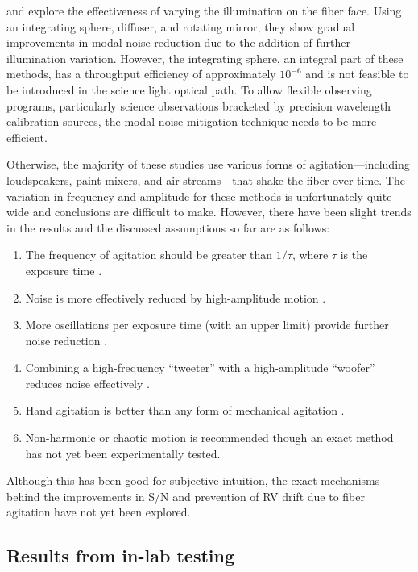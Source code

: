 \documentclass[11pt]{article}
\begin{document}
\citet{Mahadevan2014} and \citet{Halverson2014} explore the effectiveness of varying the illumination on the fiber face. Using an integrating sphere, diffuser, and rotating mirror, they show gradual improvements in modal noise reduction due to the addition of further illumination variation. However, the integrating sphere, an integral part of these methods, has a throughput efficiency of approximately $10^{-6}$ and is not feasible to be introduced in the science light optical path. To allow flexible observing programs, particularly science observations bracketed by precision wavelength calibration sources, the modal noise mitigation technique needs to be more efficient.

Otherwise, the majority of these studies use various forms of agitation---including loudspeakers, paint mixers, and air streams---that shake the fiber over time. The variation in frequency and amplitude for these methods is unfortunately quite wide and conclusions are difficult to make. However, there have been slight trends in the results and the discussed assumptions so far are as follows:
\begin{enumerate}
\item The frequency of agitation should be greater than $1/\tau$, where $\tau$ is the exposure time \citep{Baudrand2001}.
\item Noise is more effectively reduced by high-amplitude motion \citep{Lemke2011, McCoy2012}.
\item More oscillations per exposure time (with an upper limit) provide further noise reduction \citep{Lemke2011}.
\item Combining a high-frequency ``tweeter'' with a high-amplitude ``woofer'' reduces noise effectively \citep{Plavchan2013}.
\item Hand agitation is better than any form of mechanical agitation \citep{Lemke2011, McCoy2012, Mahadevan2014, Roy2014}.
\item Non-harmonic or chaotic motion is recommended \citep{Grupp2003} though an exact method has not yet been experimentally tested.
\end{enumerate}
Although this has been good for subjective intuition, the exact mechanisms behind the improvements in S/N and prevention of RV drift due to fiber agitation have not yet been explored.

\subsection{Results from in-lab testing}
\label{subsec:modal_noise_results}
\end{document}
